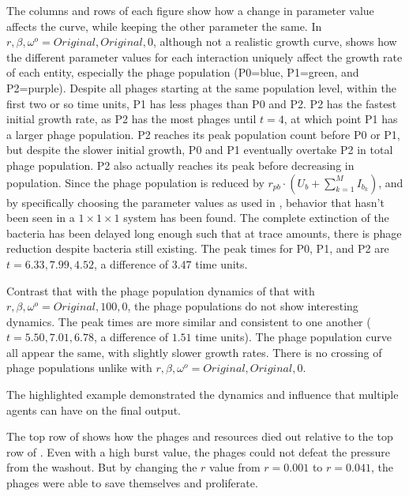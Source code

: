 The columns and rows of each figure show how a change in parameter value affects the curve, while keeping the other parameter the same. 
In $r, \beta, \omega^o=Original, Original, 0$, although not a realistic growth curve, shows how the different parameter values for each interaction uniquely affect the growth rate of each entity, especially the phage population (P0=blue, P1=green, and P2=purple). 
Despite all phages starting at the same population level, within the first two or so time units, P1 has less phages than P0 and P2. 
P2 has the fastest initial growth rate, as P2 has the most phages until $t=4$, at which point P1 has a larger phage population. 
P2 reaches its peak population count before P0 or P1, but despite the slower initial growth, P0 and P1 eventually overtake P2 in total phage population. 
P2 also actually reaches its peak before decreasing in population. 
Since the phage population is reduced by $r_{pb}\cdot(U_b + \sum_{k=1}^M I_{b_k})$, and by specifically choosing the parameter values as used in , behavior that hasn't been seen in a $1\times 1\times 1$ system has been found. 
The complete extinction of the bacteria has been delayed long enough such that at trace amounts, there is phage reduction despite bacteria still existing. 
The peak times for P0, P1, and P2 are $t=6.33, 7.99, 4.52$, a difference of $3.47$ time units. 

Contrast that with the phage population dynamics of that with $r, \beta, \omega^o = Original, 100, 0$, the phage populations do not show interesting dynamics. 
The peak times are more similar and consistent to one another ($t=5.50, 7.01, 6.78$, a difference of $1.51$ time units). 
The phage population curve all appear the same, with slightly slower growth rates. 
There is no crossing of phage populations unlike with $r, \beta, \omega^o=Original, Original, 0$. 

The highlighted example demonstrated the dynamics and influence that multiple agents can have on the final output. 

The top row of  shows how the phages and resources died out relative to the top row of . 
Even with a high burst value, the phages could not defeat the pressure from the washout. 
But by changing the $r$ value from $r=0.001$ to $r=0.041$, the phages were able to save themselves and proliferate. 


